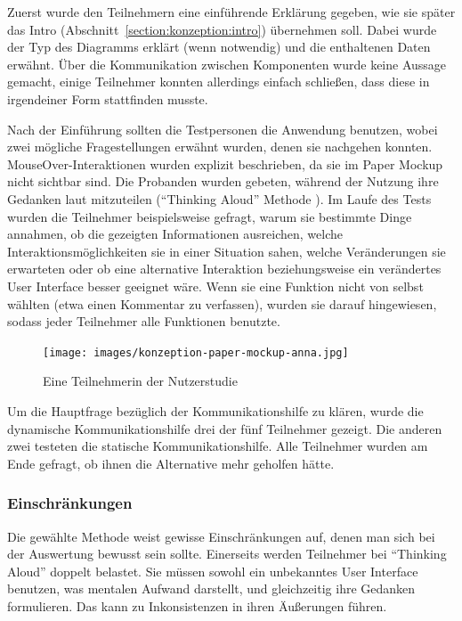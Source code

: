 \documentclass[
	headsepline,
	footsepline,
	fontsize=12pt,
	bibliography=totoc
]{scrbook}
\begin{document}

Zuerst wurde den Teilnehmern eine einführende Erklärung gegeben, wie sie später das Intro (Abschnitt~\ref{section:konzeption:intro}) übernehmen soll. Dabei wurde der Typ des Diagramms erklärt (wenn notwendig) und die enthaltenen Daten erwähnt. Über die Kommunikation zwischen Komponenten wurde keine Aussage gemacht, einige Teilnehmer konnten allerdings einfach schließen, dass diese in irgendeiner Form stattfinden musste. 


Nach der Einführung sollten die Testpersonen die Anwendung benutzen, wobei zwei mögliche Fragestellungen erwähnt wurden, denen sie nachgehen konnten. MouseOver-Interaktionen wurden explizit beschrieben, da sie im Paper Mockup nicht sichtbar sind. Die Probanden wurden gebeten, während der Nutzung ihre Gedanken laut mitzuteilen (\enquote{Thinking Aloud} Methode \cite{vanSomeren1994}). Im Laufe des Tests wurden die Teilnehmer beispielsweise gefragt, warum sie bestimmte Dinge annahmen, ob die gezeigten Informationen ausreichen, welche Interaktionsmöglichkeiten sie in einer Situation sahen, welche Veränderungen sie erwarteten oder ob eine alternative Interaktion beziehungsweise ein verändertes User Interface besser geeignet wäre. Wenn sie eine Funktion nicht von selbst wählten (etwa einen Kommentar zu verfassen), wurden sie darauf hingewiesen, sodass jeder Teilnehmer alle Funktionen benutzte.

\begin{figure}[htbp]
   \centering
   \texttt{[image: images/konzeption-paper-mockup-anna.jpg]}
   \caption{Eine Teilnehmerin der Nutzerstudie}
   \label{figure:paper-mockup-anna}
\end{figure}

Um die Hauptfrage bezüglich der Kommunikationshilfe zu klären, wurde die dynamische Kommunikationshilfe drei der fünf Teilnehmer gezeigt. Die anderen zwei testeten die statische Kommunikationshilfe. Alle Teilnehmer wurden am Ende gefragt, ob ihnen die Alternative mehr geholfen hätte.

\subsubsection{Einschränkungen}


Die gewählte Methode weist gewisse Einschränkungen auf, denen man sich bei der Auswertung bewusst sein sollte. Einerseits werden Teilnehmer bei \enquote{Thinking Aloud} doppelt belastet. Sie müssen sowohl ein unbekanntes User Interface benutzen, was mentalen Aufwand darstellt, und gleichzeitig ihre Gedanken formulieren. Das kann zu Inkonsistenzen in ihren Äußerungen führen.
\end{document}
